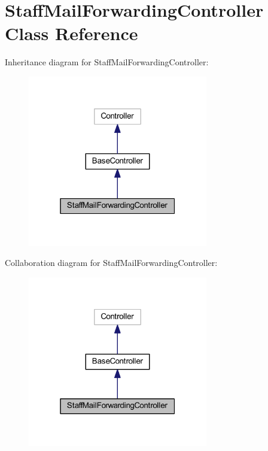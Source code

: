 \hypertarget{class_staff_mail_forwarding_controller}{}\section{Staff\+Mail\+Forwarding\+Controller Class Reference}
\label{class_staff_mail_forwarding_controller}


Inheritance diagram for Staff\+Mail\+Forwarding\+Controller\+:
\nopagebreak
\begin{figure}[H]
\begin{center}
\leavevmode
\includegraphics[width=223pt]{class_staff_mail_forwarding_controller__inherit__graph}
\end{center}
\end{figure}


Collaboration diagram for Staff\+Mail\+Forwarding\+Controller\+:
\nopagebreak
\begin{figure}[H]
\begin{center}
\leavevmode
\includegraphics[width=223pt]{class_staff_mail_forwarding_controller__coll__graph}
\end{center}
\end{figure}
